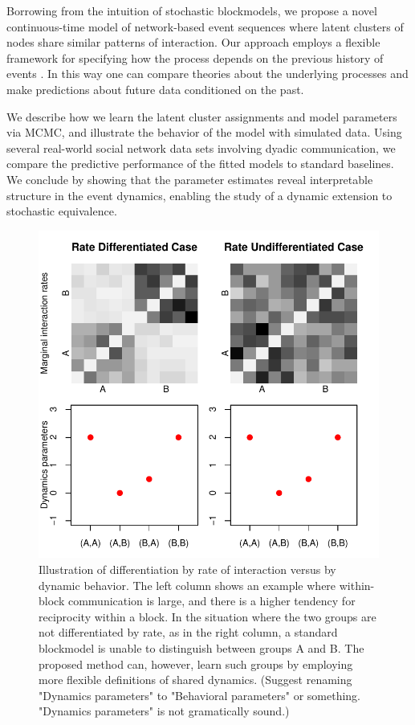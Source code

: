 %

Borrowing from the intuition of stochastic blockmodels, we propose a novel continuous-time model of network-based event sequences where latent clusters of nodes share similar patterns of interaction.
Our approach employs a flexible framework for  specifying how the process depends on the previous history of events \cite{AalenOddO.2008, Butts2008}.
In this way one can compare theories about the underlying processes and make predictions about future data conditioned on the past.

We describe how we learn the latent cluster assignments and model parameters via MCMC, and illustrate the behavior of the model with simulated data.
Using several real-world social network data sets involving dyadic communication, we compare the predictive performance of the fitted models to standard baselines.
We conclude by showing that the parameter estimates reveal interpretable structure in the event dynamics, enabling the study of a dynamic extension to stochastic equivalence.

\begin{figure}
\centering
\includegraphics[scale=.45]{../figs/introexample/all}
\caption{Illustration of differentiation by rate of interaction versus by dynamic behavior.  The left column shows an example where within-block communication is large, and there is a higher tendency for reciprocity within a block.  In the situation where the two groups are not differentiated by rate, as in the right column, a standard blockmodel is unable to distinguish between groups A and B.  The proposed method can, however, learn such groups by employing more flexible definitions of shared dynamics. {\color{red} (Suggest renaming "Dynamics parameters" to "Behavioral parameters" or something.  "Dynamics parameters" is not gramatically sound.)}}
\label{fig:example}
\end{figure}
